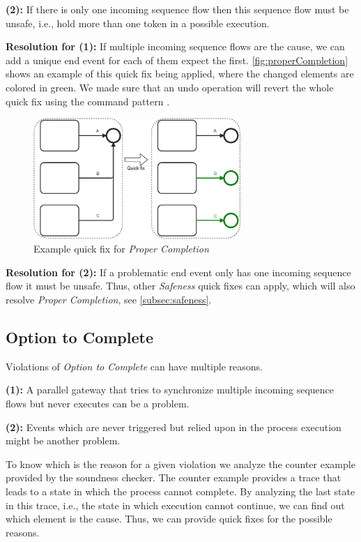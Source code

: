 \documentclass[runningheads]{llncs}
\begin{document}
\textbf{(2):} If there is only one incoming sequence flow then this sequence flow must be unsafe, i.e., hold more than one token in a possible execution.

\textbf{Resolution for (1):} If multiple incoming sequence flows are the cause, we can add a unique end event for each of them expect the first. 
\autoref{fig:properCompletion} shows an example of this quick fix being applied, where the changed elements are colored in green.
We made sure that an undo operation will revert the whole quick fix using the command pattern \cite{gammaDesignPatternsElements1995}.

\begin{figure}[ht]
	\centering
	\includegraphics[width=0.7\textwidth]{images/properCompletion}
	\caption{Example quick fix for \textit{Proper Completion}}
	\label{fig:properCompletion}
\end{figure}

\textbf{Resolution for (2):} If a problematic end event only has one incoming sequence flow it must be unsafe.
Thus, other \textit{Safeness} quick fixes can apply, which will also resolve \textit{Proper Completion}, see \autoref{subsec:safeness}.


\subsection{Option to Complete} \label{subsec:optionToComplete}
Violations of \textit{Option to Complete} can have multiple reasons.

\textbf{(1):} A parallel gateway that tries to synchronize multiple incoming sequence flows but never executes can be a problem.

\textbf{(2):} Events which are never triggered but relied upon in the process execution might be another problem.

To know which is the reason for a given violation we analyze the counter example provided by the soundness checker.
The counter example provides a trace that leads to a state in which the process cannot complete.
By analyzing the last state in this trace, i.e., the state in which execution cannot continue, we can find out which element is the cause.
Thus, we can provide quick fixes for the possible reasons.
\end{document}
